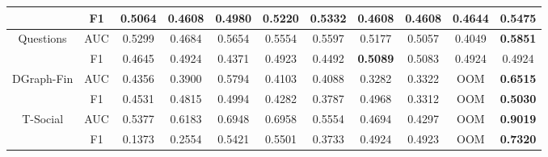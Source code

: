 \begin{table}[t]
{\begin{tabular}{cc|ccccccccc}
                            & F1      & 0.5064 & 0.4608 & 0.4980 & 0.5220 & 0.5332 & 0.4608          & 0.4608 & 0.4644          & \textbf{0.5475} \\ \hline
\multirow{2}{*}{Questions}  & AUC     & 0.5299 & 0.4684 & 0.5654 & 0.5554 & 0.5597 & 0.5177          & 0.5057 & 0.4049          & \textbf{0.5851} \\
                            & F1      & 0.4645 & 0.4924 & 0.4371 & 0.4923 & 0.4492 & \textbf{0.5089} & 0.5083 & 0.4924          & 0.4924          \\ \hline
\multirow{2}{*}{DGraph-Fin} & AUC     & 0.4356 & 0.3900 & 0.5794 & 0.4103 & 0.4088 & 0.3282          & 0.3322 & OOM             & \textbf{0.6515} \\
                            & F1      & 0.4531 & 0.4815 & 0.4994 & 0.4282 & 0.3787 & 0.4968          & 0.3312 & OOM             & \textbf{0.5030} \\ \hline
\multirow{2}{*}{T-Social}   & AUC     & 0.5377 & 0.6183 & 0.6948 & 0.6958 & 0.5554 & 0.4694          & 0.4297 & OOM             & \textbf{0.9019} \\
                            & F1      & 0.1373 & 0.2554 & 0.5421 & 0.5501 & 0.3733 & 0.4924          & 0.4923 & OOM             & \textbf{0.7320} \\ \hline \hline
\end{tabular}
}\vspace{-4mm}
\end{table}

